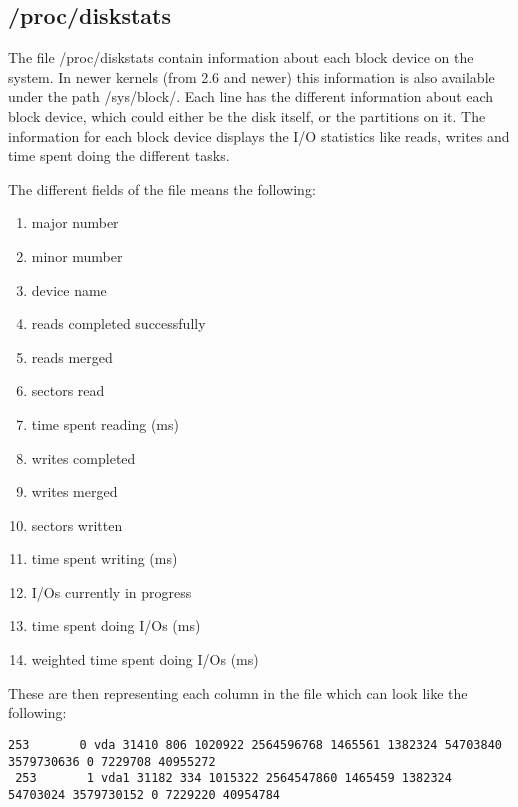\subsection{/proc/diskstats}
The file /proc/diskstats contain information about each block device on the
system. In newer kernels (from 2.6 and newer) this information is also available
under the path /sys/block/. Each line has the different information about each
block device, which could either be the disk itself, or the partitions on it.
The information for each block device displays the I/O statistics like reads,
writes and time spent doing the different tasks.

The different fields of the file means the following:
\begin{enumerate}\itemsep1pt \parskip0pt 
    \item major number
    \item minor mumber
    \item device name
    \item reads completed successfully
    \item reads merged
    \item sectors read
    \item time spent reading (ms)
    \item writes completed
    \item writes merged
    \item sectors written
    \item time spent writing (ms)
    \item I/Os currently in progress
    \item time spent doing I/Os (ms)
    \item weighted time spent doing I/Os (ms)
\end{enumerate}
\label{lbl:column_description}

These are then representing each column in the file which can look like the
following:
\begin{center}
\begin{lstlisting}[label=lbl:content, caption=Contents of /proc/diskstats,
numbers=none]
 253       0 vda 31410 806 1020922 2564596768 1465561 1382324 54703840 3579730636 0 7229708 40955272
 253       1 vda1 31182 334 1015322 2564547860 1465459 1382324 54703024 3579730152 0 7229220 40954784
\end{lstlisting}
\end{center}
\label{lbl:content}

